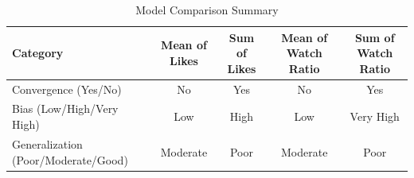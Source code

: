 \begin{table}[H]
\centering
\caption{Model Comparison Summary}
\renewcommand{\arraystretch}{1.5} %
\setlength{\tabcolsep}{5.5pt} %
\begin{tabular}{|p{3.5cm}|c|c|c|c|}
\hline
\textbf{Category} & \textbf{Mean of Likes} & \textbf{Sum of Likes} & \textbf{Mean of Watch Ratio} & \textbf{Sum of Watch Ratio} \\ \hline
Convergence {\tiny (Yes/No)} & No & Yes & No & Yes \\ \hline
Bias {\tiny (Low/High/Very High)} & Low & High & Low & Very High \\ \hline
Generalization {\tiny (Poor/Moderate/Good)} & Moderate & Poor & Moderate & Poor \\ \hline
\end{tabular}
\label{tab:reward-methodology}
\end{table}





    




